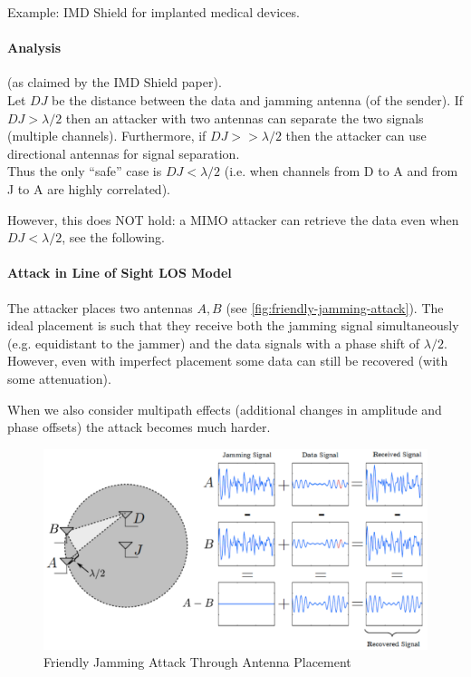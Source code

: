 Example: IMD Shield for implanted medical devices.

\paragraph{Analysis} (as claimed by the IMD Shield paper). \\
Let $DJ$ be the distance between the data and jamming antenna (of the sender).
If $DJ > \lambda/2$ then an attacker with two antennas can separate the two signals (multiple channels).
Furthermore, if $DJ >> \lambda/2$ then the attacker can use directional antennas for signal separation.
\\
Thus the only ``safe'' case is $DJ < \lambda/2$ (i.e. when channels from D to A and from J to A are highly correlated).

However, this does NOT hold:
a MIMO attacker can retrieve the data even when $DJ < \lambda/2$, see the following.

\paragraph{Attack in Line of Sight LOS Model} 
The attacker places two antennas $A, B$ (see \autoref{fig:friendly-jamming-attack}).
The ideal placement is such that they receive both the jamming signal simultaneously (e.g. equidistant to the jammer) and the data signals with a phase shift of $\lambda/2$.
However, even with imperfect placement some data can still be recovered (with some attenuation).

When we also consider multipath effects (additional changes in amplitude and phase offsets) the attack becomes much harder.

\begin{figure}[h]
	\centering
	\includegraphics[scale=0.4]{images/7-friendly-jamming-attack.png}
	\caption{Friendly Jamming Attack Through Antenna Placement}
	\label{fig:friendly-jamming-attack}
\end{figure}

